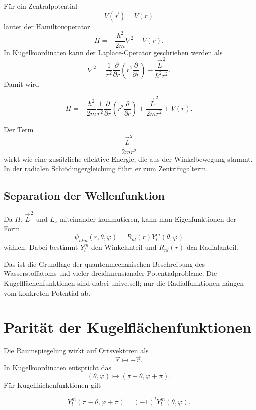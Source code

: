 Für ein Zentralpotential
\[
    V(\vec r)=V(r)
\]
lautet der Hamiltonoperator
\[
    H=-\frac{\hbar^2}{2m}\nabla^2+V(r).
\]
In Kugelkoordinaten kann der Laplace-Operator geschrieben werden als
\[
    \nabla^2
    =\frac{1}{r^2}\frac{\partial}{\partial r}
    \left(r^2\frac{\partial}{\partial r}\right)
    -\frac{\vec L^{\,2}}{\hbar^2r^2}.
\]
Damit wird
\begin{formulabox}
\[
    H=-\frac{\hbar^2}{2m}\frac{1}{r^2}\frac{\partial}{\partial r}
    \left(r^2\frac{\partial}{\partial r}\right)
    +\frac{\vec L^{\,2}}{2mr^2}+V(r).
\]
\end{formulabox}

\begin{conceptbox}
Der Term
\[
    \frac{\vec L^{\,2}}{2mr^2}
\]
wirkt wie eine zusätzliche effektive Energie, die aus der Winkelbewegung stammt. In der radialen Schrödingergleichung führt er zum Zentrifugalterm.
\end{conceptbox}

\subsection{Separation der Wellenfunktion}

Da \(H\), \(\vec L^{\,2}\) und \(L_z\) miteinander kommutieren, kann man Eigenfunktionen der Form
\[
    \psi_{nlm}(r,\theta,\varphi)=R_{nl}(r)Y_l^m(\theta,\varphi)
\]
wählen. Dabei bestimmt \(Y_l^m\) den Winkelanteil und \(R_{nl}(r)\) den Radialanteil.

\begin{notebox}
Das ist die Grundlage der quantenmechanischen Beschreibung des Wasserstoffatoms und vieler dreidimensionaler Potentialprobleme. Die Kugelflächenfunktionen sind dabei universell; nur die Radialfunktionen hängen vom konkreten Potential ab.
\end{notebox}

\section{Parität der Kugelflächenfunktionen}

Die Raumspiegelung wirkt auf Ortsvektoren als
\[
    \vec r\mapsto -\vec r.
\]
In Kugelkoordinaten entspricht das
\[
    (\theta,\varphi)\mapsto (\pi-\theta,\varphi+\pi).
\]
Für Kugelflächenfunktionen gilt
\begin{formulabox}
\[
    Y_l^m(\pi-\theta,\varphi+\pi)=(-1)^lY_l^m(\theta,\varphi).
\]
\end{formulabox}

